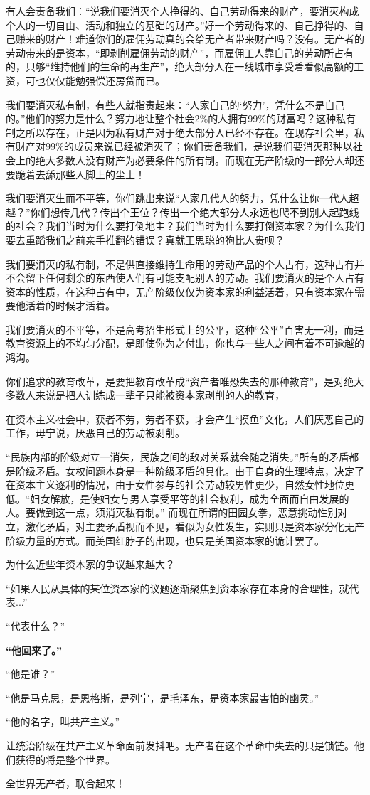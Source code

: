 \documentclass[UTF8]{ctexart}
\begin{document}
    有人会责备我们：“说我们要消灭个人挣得的、自己劳动得来的财产，要消灭构成个人的一切自由、活动和独立的基础的财产。”好一个劳动得来的、自己挣得的、自己赚来的财产！难道你们的雇佣劳动真的会给无产者带来财产吗？没有。无产者的劳动带来的是资本，“即剥削雇佣劳动的财产”，而雇佣工人靠自己的劳动所占有的，只够“维持他们的生命的再生产”，绝大部分人在一线城市享受着看似高额的工资，可也仅仅能勉强偿还房贷而已。
    
    我们要消灭私有制，有些人就指责起来：“人家自己的‘努力’，凭什么不是自己的。”他们的努力是什么？努力地让整个社会2\%的人拥有99\%的财富吗？这种私有制之所以存在，正是因为私有财产对于绝大部分人已经不存在。在现存社会里，私有财产对99\%的成员来说已经被消灭了；你们责备我们，是说我们要消灭那种以社会上的绝大多数人没有财产为必要条件的所有制。而现在无产阶级的一部分人却还要跪着去舔那些人脚上的尘土！

    我们要消灭生而不平等，你们跳出来说“人家几代人的努力，凭什么让你一代人超越？”你们想传几代？传出个王位？传出一个绝大部分人永远也爬不到别人起跑线的社会？我们当时为什么要打倒地主？我们当时为什么要打倒资本家？为什么我们要去重蹈我们之前亲手推翻的错误？真就王思聪的狗比人贵呗？

    我们要消灭的私有制，不是供直接维持生命用的劳动产品的个人占有，这种占有并不会留下任何剩余的东西使人们有可能支配别人的劳动。我们要消灭的是个人占有资本的性质，在这种占有中，无产阶级仅仅为资本家的利益活着，只有资本家在需要他活着的时候才活着。

    我们要消灭的不平等，不是高考招生形式上的公平，这种“公平”百害无一利，而是教育资源上的不均匀分配，是即使你为之付出，你也与一些人之间有着不可逾越的鸿沟。

    你们追求的教育改革，是要把教育改革成“资产者唯恐失去的那种教育”，是对绝大多数人来说是把人训练成一辈子只能被资本家剥削的人的教育，
    
    在资本主义社会中，获者不劳，劳者不获，才会产生“摸鱼”文化，人们厌恶自己的工作，毋宁说，厌恶自己的劳动被剥削。

    “民族内部的阶级对立一消失，民族之间的敌对关系就会随之消失。”所有的矛盾都是阶级矛盾。女权问题本身是一种阶级矛盾的具化。由于自身的生理特点，决定了在资本主义逐利的情况，由于女性参与的社会劳动较男性更少，自然女性地位更低。“妇女解放，是使妇女与男人享受平等的社会权利，成为全面而自由发展的人。要做到这一点，须消灭私有制。”
    而现在所谓的田园女拳，恶意挑动性别对立，激化矛盾，对主要矛盾视而不见，看似为女性发生，实则只是资本家分化无产阶级力量的方式。而美国红脖子的出现，也只是美国资本家的诡计罢了。

    为什么近些年资本家的争议越来越大？
    
    “如果人民从具体的某位资本家的议题逐渐聚焦到资本家存在本身的合理性，就代表...”

    “代表什么？”

    \textbf{“他回来了。”}
    
    “他是谁？”

    “他是马克思，是恩格斯，是列宁，是毛泽东，是资本家最害怕的幽灵。”

    “他的名字，叫共产主义。”

    让统治阶级在共产主义革命面前发抖吧。无产者在这个革命中失去的只是锁链。他们获得的将是整个世界。
    
    全世界无产者，联合起来！
\end{document}
